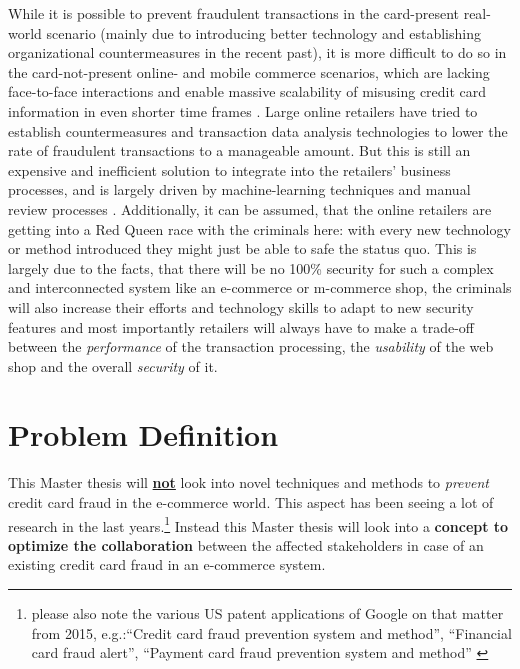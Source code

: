 While it is possible to prevent fraudulent transactions in the card-present real-world scenario (mainly due to introducing better technology and establishing organizational
countermeasures in the recent past), it is more difficult to do so in the card-not-present online- and mobile commerce scenarios, which are lacking face-to-face interactions
and enable massive scalability of misusing credit card information in even shorter time frames \citep{Lewis2015}. Large online retailers have tried to establish countermeasures
and transaction data analysis technologies to lower the rate of fraudulent transactions to a manageable amount. But this is still an expensive and inefficient solution to integrate
into the retailers’ business processes, and is largely driven by machine-learning techniques and manual review processes \citep{Brachmann2015}. Additionally, it can be assumed,
that the online retailers are getting into a Red Queen race with the criminals here: with every new technology or method introduced they might just be able to safe the status quo.
This is largely due to the facts, that there will be no 100\% security for such a complex and interconnected system like an e-commerce or m-commerce shop, the criminals will also
increase their efforts and technology skills to adapt to new security features and most importantly retailers will always have to make a trade-off between the \textit{performance}
of the transaction processing, the \textit{usability} of the web shop and the overall \textit{security} of it.


\section{Problem Definition}
\label{sec:problem_definition}

This Master thesis will \textbf{\underline{not}} look into novel techniques and methods to \textit{prevent} credit card fraud in the e-commerce world. This aspect has been seeing a lot of research
in the last years.\footnote{please also note the various US patent applications of Google on that matter from 2015, e.g.:“Credit card fraud prevention system and method”,
“Financial card fraud alert”, “Payment card fraud prevention system and method” \citep{GooglePatents2015}}
Instead this Master thesis will look into a \textbf{concept to optimize the collaboration} between the affected stakeholders in case of an existing credit card fraud in an e-commerce system. \\

